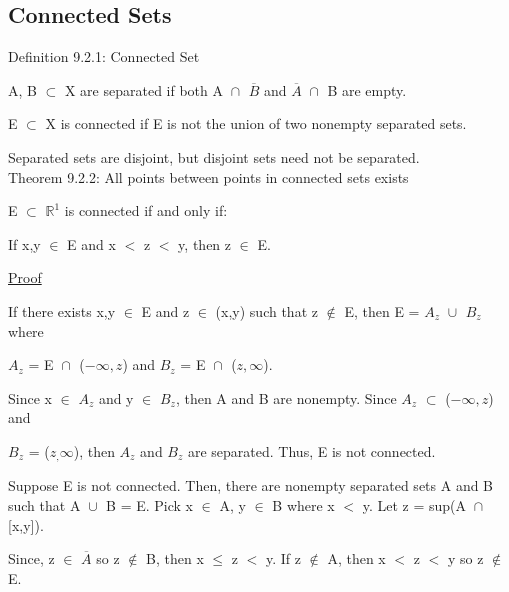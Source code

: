 \newpage





\subsection{ Connected Sets }

{ \color{blue} Definition 9.2.1: Connected Set } 

	\begin{adjustbox}{minipage=14cm, right, vspace=0.1cm 0cm}
		A, B $\subset$ X are separated if both
		A $\cap_{}^{}$ $\overline{B}$ and
		$\overline{A}$ $\cap_{}^{}$ B are empty.

		E $\subset$ X is connected if E is not the union of two nonempty
		separated sets.

		Separated sets are disjoint, but disjoint sets need not be separated. \\
	\end{adjustbox}

{ \color{red} Theorem 9.2.2: All points between points in connected sets exists } 

	\begin{adjustbox}{minipage=14cm, right, vspace=0.1cm 0cm}
		E $\subset$ $\mathbb{R}^1$ is connected if and only if:

		\hspace{1cm} If x,y $\in$ E and x $<$ z $<$ y, then z $\in$ E.
	\end{adjustbox}

{ \color{magenta} \underline{Proof} } 

	If there exists x,y $\in$ E and z $\in$ (x,y) such that z $\not \in$ E,
	then E = $A_z$ $\cup_{}^{}$ $B_z$ where
	
	$A_z$ = E $\cap_{}^{}$ ($-\infty,z$)
	and $B_z$ = E $\cap_{}^{}$ ($z,\infty$).

	Since x $\in$ $A_z$ and y $\in$ $B_z$, then A and B are nonempty.
	Since $A_z$ $\subset$ ($-\infty,z$) and
	
	$B_z$ = ($z_,\infty$),
	then $A_z$ and $B_z$ are separated. Thus, E is not connected.

	\vspace{0.2cm}

	Suppose E is not connected. Then, there are nonempty separated sets
	A and B such that A $\cup_{}^{}$ B = E. Pick x $\in$ A, y $\in$ B
	where x $<$ y. Let z = sup(A $\cap_{}^{}$ [x,y]).

	Since, z $\in$ $\overline{A}$ so z $\not \in$ B, then x $\leq$ z $<$ y.
	If z $\not \in$ A, then x $<$ z $<$ y so z $\not \in$ E.

